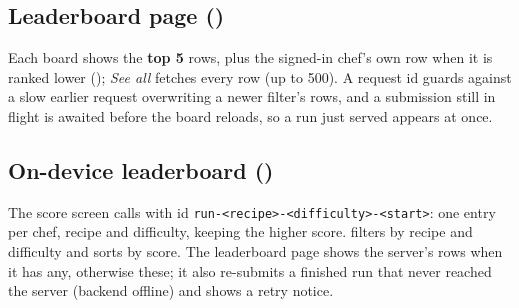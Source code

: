 \documentclass[11pt,a4paper]{article}
\begin{document}
\subsection{Leaderboard page ()}
Each board shows the \textbf{top 5} rows, plus the signed-in chef's own row when it is ranked
lower (); \emph{See all} fetches every row (up to 500). A request id guards
against a slow earlier request overwriting a newer filter's rows, and a submission still in
flight is awaited before the board reloads, so a run just served appears at once.

\subsection{On-device leaderboard ()}
The score screen calls  with id
\texttt{run-<recipe>-<difficulty>-<start>}: one entry per chef, recipe and difficulty, keeping
the higher score.  filters by recipe and difficulty and sorts by score. The
leaderboard page shows the server's rows when it has any, otherwise these; it also re-submits
a finished run that never reached the server (backend offline) and shows a retry notice.

\end{document}
